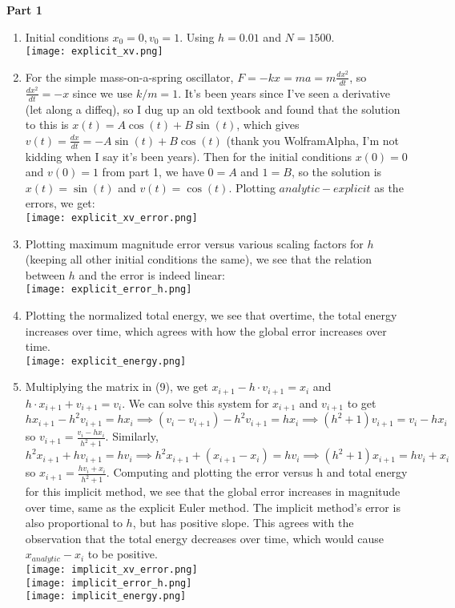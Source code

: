 \documentclass{article}
\newcommand{\9}{\left( }
\newcommand{\0}{\right) }
\begin{document}
\pagestyle{fancy}

\noindent \textbf{Part 1}
\begin{enumerate}
    \item Initial conditions $x_0 = 0, v_0 = 1$. Using $h = 0.01$ and $N = 1500$.\\
    \texttt{[image: explicit\_xv.png]}
    
    \item For the simple mass-on-a-spring oscillator, $F = -kx = ma = m\frac{dx^2}{dt}$, so $\frac{dx^2}{dt} = -x$ since we use $k/m = 1$. It's been years since I've seen a derivative (let along a diffeq), so I dug up an old textbook and found that the solution to this is $x(t) = A \cos(t) + B\sin(t)$, which gives $v(t) = \frac{dx}{dt} = -A\sin(t) + B\cos(t)$ (thank you WolframAlpha, I'm not kidding when I say it's been years). Then for the initial conditions $x(0) = 0$ and $v(0) = 1$ from part 1, we have $0 = A$ and $1 = B$, so the solution is $x(t) = \sin(t)$ and $v(t) = \cos(t)$. Plotting $analytic - explicit$ as the errors, we get:\\
    \texttt{[image: explicit\_xv\_error.png]}
    
    \item Plotting maximum magnitude error versus various scaling factors for $h$ (keeping all other initial conditions the same), we see that the relation between $h$ and the error is indeed linear:\\
    \texttt{[image: explicit\_error\_h.png]}
    
    \item Plotting the normalized total energy, we see that overtime, the total energy increases over time, which agrees with how the global error increases over time.\\
    \texttt{[image: explicit\_energy.png]}
    
    \item Multiplying the matrix in (9), we get $x_{i+1} - h \cdot v_{i+1} = x_i$ and $h\cdot x_{i+1} + v_{i+1} = v_i$.  We can solve this system for $x_{i+1}$ and $v_{i+1}$ to get  $h x_{i+1} - h^2 v_{i+1} = h x_i \implies (v_i - v_{i+1}) - h^2 v_{i+1} = h x_i \implies (h^2 + 1)v_{i+1} = v_i - hx_i$ so $v_{i+1} = \frac{v_i - hx_i}{h^2 + 1}$. Similarly, $h^2 x_{i+1} + hv_{i+1} = hv_i \implies h^2 x_{i+1} + (x_{i+1} - x_i) = hv_i \implies (h^2 + 1)x_{i+1} = hv_i + x_i$ so $x_{i+1} = \frac{hv_i + x_i}{h^2 + 1}$. Computing and plotting the error versus h and total energy for this implicit method, we see that the global error increases in magnitude over time, same as the explicit Euler method. The implicit method's error is also proportional to $h$, but has positive slope. This agrees with the observation that the total energy decreases over time, which would cause $x_{analytic} - x_i$ to be positive.\\
    \texttt{[image: implicit\_xv\_error.png]}\\
    \texttt{[image: implicit\_error\_h.png]}\\
    \texttt{[image: implicit\_energy.png]}
    
\end{enumerate}
\end{document}
